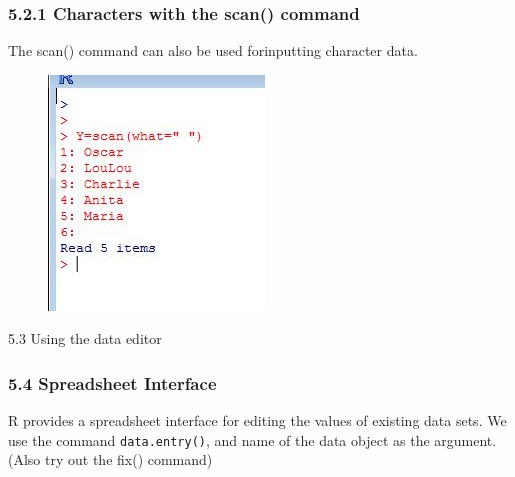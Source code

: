 \documentclass{beamer}
\begin{document}
 	\begin{frame}
 		\frametitle{5.2.1 Characters with the scan() command}
 		The scan() command can also be used forinputting character data.
 		\begin{figure}
 			\centering
 			\includegraphics[width=1.2\linewidth]{images/scandognames}
 		\end{figure}
 		
 	\end{frame}
 	\begin{frame}
 		5.3 Using the data editor
 		
 	\end{frame}
 	\begin{frame}
 		\frametitle{5.4 Spreadsheet Interface}
 		R provides a spreadsheet interface for editing the values of existing data sets. We use the
 		command \texttt{data.entry()}, and name of the data object as the argument. (Also try out the
 		fix() command)
 		
 	\end{frame}
 	
 	
 	
 	
 	
 
\end{document}
